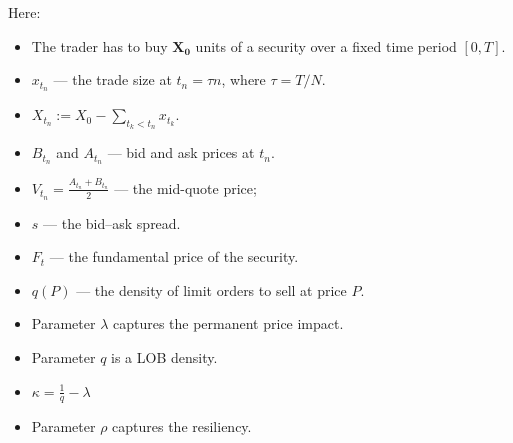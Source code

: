 Here:
\begin{itemize}
 \item The trader has to buy $\mathbf{X_0}$ units of a security over a ﬁxed time period $[0,T]$. 
 \item $x_{t_n}$ 
 --- the trade size at $t_n = \tau n$, where $\tau = T / N$. 
 \item $X_{t_n} := X_0 - \sum _{t_k < t_n} x_{t_k}$. 
 \item $B_{t_n}$ and $A_{t_n}$ --- bid and ask prices at $t_n$. 
 \item $V_{t_n} = \frac{A_{t_n} + B_{t_n}}{2}$ 
 --- the mid-quote price; 
 \item $s$ --- the bid–ask spread.
 \item $F_t$ --- the fundamental price of the security.
 \item $q(P)$ --- the density of limit orders to sell at price $P$.
 \item Parameter $\lambda$ captures the permanent price impact.
 \item Parameter $q$ is a LOB density. 
  \item $\kappa = \frac{1}{q} - \lambda $
 \item Parameter $\rho$ captures the resiliency.
\end{itemize}

